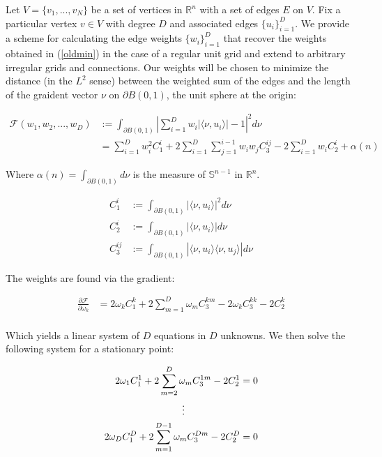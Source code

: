 \documentclass[12pt]{article}
\begin{document}
Let $V = \{v_1,...,v_N\}$ be a set of vertices in $\mathbb{R}^n$ with a set of edges $E$ on $V$. Fix a particular vertex $v \in V$ with degree $D$ and associated edges  $\{u_i\}_{i=1}^D$. We provide a scheme for calculating the edge weights $\{w_i\}_{i=1}^D$ that recover the weights obtained in (\ref{oldmin}) in the case of a regular unit grid and extend to arbitrary irregular grids and connections. Our weights will be chosen to minimize the distance (in the $L^2$ sense) between the weighted sum of the edges and the length of the graident vector $\nu$ on $\partial B(0,1)$, the unit sphere at the origin:

\begin{align}
\mathcal{F}(w_1,w_2,...,w_D) &:= \int_{\partial B(0,1)} \left|\sum_{i=1}^D w_i |\langle \nu, u_i \rangle| - 1 \right|^2d\nu\\
&= \sum_{i=1}^D w_i^2C_1^i + 2 \sum_{i=1}^D \sum_{j=1}^{i-1} w_i w_j C_3^{ij} - 2 \sum_{i=1}^D w_i C_2^i + \alpha(n)
\end{align}

Where $\alpha(n) = \int_{\partial B(0,1)}d\nu$ is the measure of $\mathbb{S}^{n-1}$ in $\mathbb{R}^n$. 

\begin{align*}
C_1^i &:= \int_{\partial B(0,1)} |\langle \nu,u_i \rangle|^2 d\nu\\
C_2^i &:= \int_{\partial B(0,1)} |\langle \nu,u_i \rangle| d\nu\\
C_3^{ij} &:= \int_{\partial B(0,1)} |\langle \nu,u_i \rangle \langle \nu, u_j \rangle| d\nu
\end{align*}

The weights are found via the gradient:

\begin{align*}
	\frac{\partial \mathcal{F}}{\partial \omega_k}  &= 2 \omega_k C_1^k + 2 \sum_{m=1}^{D}\omega_{m}C_{3}^{km} - 2\omega_kC_3^{kk} - 2 C_2^k\\
\end{align*}

Which yields a linear system of $D$ equations in $D$ unknowns. We then solve the following system for a stationary point:

\begin{align*}
2 \omega_1 C_1^1 + 2 \sum_{m=2}^{D}\omega_{m}C_{3}^{1m}  - 2 C_2^1 &= 0\\
\vdots \hspace{20mm} & \\
2 \omega_D C_1^D + 2 \sum_{m=1}^{D-1}\omega_{m}C_{3}^{Dm} - 2 C_2^D &= 0\\
\end{align*}
\end{document}
